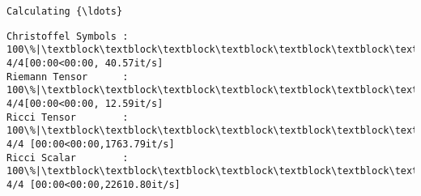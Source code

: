 \documentclass[11pt]{article}
\newcommand{\prompt}[4]{
        {\ttfamily\llap{{\color{#2}[#3]:\hspace{3pt}#4}}\vspace{-\baselineskip}}
    }
\begin{document}
    \begin{Verbatim}[commandchars=\\\{\}]
Calculating {\ldots}
    \end{Verbatim}

    \begin{Verbatim}[commandchars=\\\{\}]
Christoffel Symbols : 100\%|\textblock\textblock\textblock\textblock\textblock\textblock\textblock\textblock\textblock\textblock\textblock\textblock\textblock\textblock\textblock\textblock\textblock\textblock\textblock\textblock\textblock\textblock\textblock\textblock\textblock\textblock\textblock\textblock\textblock\textblock\textblock\textblock\textblock\textblock\textblock| 4/4[00:00<00:00, 40.57it/s]
Riemann Tensor      : 100\%|\textblock\textblock\textblock\textblock\textblock\textblock\textblock\textblock\textblock\textblock\textblock\textblock\textblock\textblock\textblock\textblock\textblock\textblock\textblock\textblock\textblock\textblock\textblock\textblock\textblock\textblock\textblock\textblock\textblock\textblock\textblock\textblock\textblock\textblock\textblock| 4/4[00:00<00:00, 12.59it/s]
Ricci Tensor        : 100\%|\textblock\textblock\textblock\textblock\textblock\textblock\textblock\textblock\textblock\textblock\textblock\textblock\textblock\textblock\textblock\textblock\textblock\textblock\textblock\textblock\textblock\textblock\textblock\textblock\textblock\textblock\textblock\textblock\textblock\textblock\textblock\textblock\textblock| 4/4 [00:00<00:00,1763.79it/s]
Ricci Scalar        : 100\%|\textblock\textblock\textblock\textblock\textblock\textblock\textblock\textblock\textblock\textblock\textblock\textblock\textblock\textblock\textblock\textblock\textblock\textblock\textblock\textblock\textblock\textblock\textblock\textblock\textblock\textblock\textblock\textblock\textblock\textblock\textblock\textblock| 4/4 [00:00<00:00,22610.80it/s]
    \end{Verbatim}
 
            
\prompt{Out}{outcolor}{11}{}
    
\end{document}
